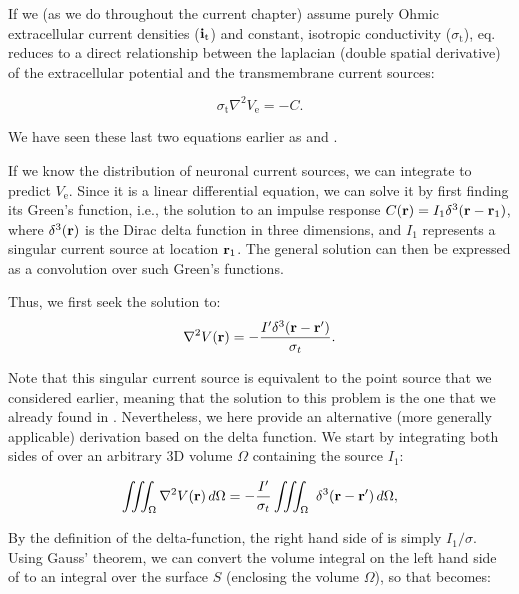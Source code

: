 If we (as we do throughout the current chapter) assume purely Ohmic extracellular current densities (${\bf i}_\mathrm{t}$) 
and constant, isotropic conductivity ($\sigma_\mathrm{t}$), eq.  reduces to a direct relationship 
between the laplacian (double spatial derivative) of the extracellular potential and the transmembrane current sources: 

\begin{equation}
\sigma_\text{t} \nabla^2{V_\mathrm{e}} = -C.
\label{eq:VC:CSD3}
\end{equation}

We have seen these last two equations earlier as  and . 

If we know the distribution of neuronal current sources, 
we can integrate  to predict $V_\mathrm{e}$. 
Since it is a linear differential equation, we can solve it by first finding its Green's function, 
i.e., the solution to an impulse response $C({\bf r}) = I_1 \delta^3({\bf r}-{\bf r}_1)$, 
where $\delta^3({\bf r})$ is the Dirac delta function in three dimensions, 
and $I_1$ represents a singular current source at location ${\bf r}_1$. 
The general solution can then be expressed as a convolution over such Green's functions. 

Thus, we first seek the solution to:
\begin{equation}
\nabla^2 V({\bf r}) = - \frac{I' \delta^3({\bf r-r'})}{\sigma_t}.
\label{eq:VC:CSD5}
\end{equation}

Note that this singular current source is equivalent to the point source that we considered earlier, 
meaning that the solution to this problem is the one that we already found in . 
Nevertheless, we here provide an alternative (more generally applicable) derivation based on the delta function. 
We start by integrating both sides of  over an arbitrary 3D volume $\Omega$ containing the source $I_1$:

\begin{equation}
\iiint_{\Omega} \nabla^2V({\bf r}) \,d\Omega =  - \frac{I'}{\sigma_t} \iiint_\Omega \ \delta^3({\bf r-r'}) \, d\Omega,
\label{eq:VC:marit}
\end{equation}

By the definition of the delta-function, the right hand side of  is simply $I_1/\sigma$. 
Using Gauss' theorem, we can convert the volume integral on the left hand side of  
to an integral over the surface $S$ (enclosing the volume $\Omega$), 
so that  becomes:

